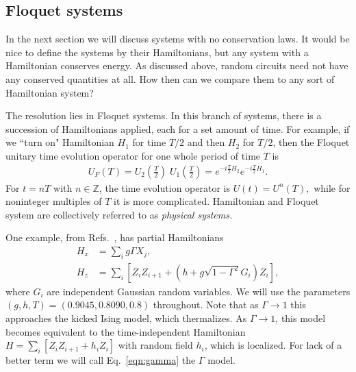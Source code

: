 \documentclass[a4paper,11pt]{article}
\newcommand{\nn}{\nonumber\\}
\begin{document}
\subsection{Floquet systems} \label{sub:floq}

In the next section we will discuss systems with no conservation laws. It would be nice to define the systems by their Hamiltonians, but any system with a Hamiltonian conserves energy. As discussed above, random circuits need not have any conserved quantities at all. How then can we compare them to any sort of Hamiltonian system?

The resolution lies in Floquet systems. In this branch of systems, there is a succession of Hamiltonians applied, each for a set amount of time. For example, if we ``turn on" Hamiltonian $H_1$ for time $T/2$ and then $H_2$ for $T/2$, then the Floquet unitary time evolution operator for one whole period of time $T$ is 
\begin{align}
U_F(T) = U_2\left(\frac{T}{2}\right)\; U_1\left(\frac{T}{2}\right) = e^{-i\frac{T}{2}H_2} e^{-i\frac{T}{2}H_1}.
\end{align}
For $t=nT$ with $n\in \mathbb{Z}$, the time evolution operator is $U(t)=U^n(T),$ while for noninteger multiples of $T$ it is more complicated. Hamiltonian and Floquet system are collectively referred to as \emph{physical systems.}
%

One example, from Refs.~\cite{ZhangFloq, ChenOtoc}, has partial Hamiltonians 
\begin{align}
H_x &= \sum_i g\Gamma X_j,\nn
H_z &= \sum_i \left[Z_iZ_{i+1} + (h+g\sqrt{1-\Gamma^2}G_i)Z_i\right], \label{eqn:gamma}
\end{align}
where $G_i$ are independent Gaussian random variables. We will use the parameters $(g,h,T) = (0.9045,0.8090,0.8)$ throughout.
Note that as $\Gamma\to1$ this approaches the kicked Ising model, which thermalizes. As $\Gamma\to1$, this model becomes equivalent to the time-independent Hamiltonian $H=\sum_i\left[Z_iZ_{i+1} + h_iZ_i\right]$ with random field $h_i$, which is localized. For lack of a better term we will call Eq.~\ref{eqn:gamma} the $\Gamma$ model.
\end{document}
